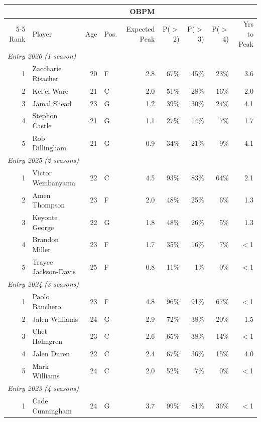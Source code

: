 \begin{table}[htbp]
  \centering\small
  \begin{tabular}{rlrlrrrrr}
    \toprule
     & & & & OBPM & & & & \\
    \cmidrule(lr){5-5}
    Rank & Player & Age & Pos. & Expected Peak & P($>$2) & P($>$3) & P($>$4) & Yrs to Peak \\
    \midrule
    \multicolumn{9}{l}{\textit{Entry 2026 (1 season)}} \\
    \midrule
    1 & Zaccharie Risacher & 20 & F & 2.8 & 67\% & 45\% & 23\% & 3.6 \\
    2 & Kel'el Ware & 21 & C & 2.0 & 51\% & 28\% & 16\% & 2.0 \\
    3 & Jamal Shead & 23 & G & 1.2 & 39\% & 30\% & 24\% & 4.1 \\
    4 & Stephon Castle & 21 & G & 1.1 & 27\% & 14\% & 7\% & 1.7 \\
    5 & Rob Dillingham & 21 & G & 0.9 & 34\% & 21\% & 9\% & 4.1 \\
    \midrule[0.4pt]
    \multicolumn{9}{l}{\textit{Entry 2025 (2 seasons)}} \\
    \midrule
    1 & Victor Wembanyama & 22 & C & 4.5 & 93\% & 83\% & 64\% & 2.1 \\
    2 & Amen Thompson & 23 & F & 2.0 & 48\% & 25\% & 6\% & 1.3 \\
    3 & Keyonte George & 22 & G & 1.8 & 48\% & 26\% & 5\% & 1.3 \\
    4 & Brandon Miller & 23 & F & 1.7 & 35\% & 16\% & 7\% & $<$1 \\
    5 & Trayce Jackson-Davis & 25 & F & 0.8 & 11\% & 1\% & 0\% & $<$1 \\
    \midrule[0.4pt]
    \multicolumn{9}{l}{\textit{Entry 2024 (3 seasons)}} \\
    \midrule
    1 & Paolo Banchero & 23 & F & 4.8 & 96\% & 91\% & 67\% & $<$1 \\
    2 & Jalen Williams & 24 & G & 2.9 & 72\% & 38\% & 20\% & 1.5 \\
    3 & Chet Holmgren & 23 & C & 2.6 & 65\% & 38\% & 14\% & $<$1 \\
    4 & Jalen Duren & 22 & C & 2.4 & 67\% & 36\% & 15\% & 4.0 \\
    5 & Mark Williams & 24 & C & 2.0 & 52\% & 7\% & 0\% & $<$1 \\
    \midrule[0.4pt]
    \multicolumn{9}{l}{\textit{Entry 2023 (4 seasons)}} \\
    \midrule
    1 & Cade Cunningham & 24 & G & 3.7 & 99\% & 81\% & 36\% & $<$1 \\

\end{tabular}
\end{table}
